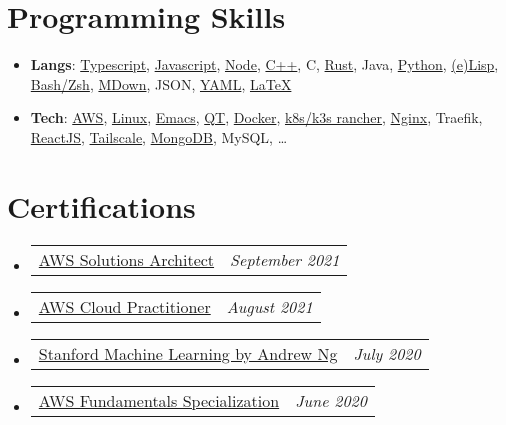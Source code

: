 \documentclass[letterpaper,11pt]{article}
\makeatletter
\newcommand{\resumeItem}[2]{
	\item[]\small{
		\textbf{#1}{: #2 \vspace{-2pt}}
	}
}
\newcommand{\certItem}[2]{
	\vspace{-1pt}\item[]
	\begin{tabular*}{0.96\textwidth}{l@{\extracolsep{\fill}}r}
		#1 & \textit{\small #2} \\
	\end{tabular*}\vspace{-7pt}
}
\newcommand{\resumeSubHeadingListStart}{\begin{itemize}[leftmargin=1mm]}
\newcommand{\resumeSubHeadingListEnd}{\end{itemize}}
\makeatother
\begin{document}
\section{Programming Skills}
\resumeSubHeadingListStart{}
\resumeItem{Langs}
{\href{https://dev.hsrn.nyu.edu/corelink/corelink-examples/-/tree/dev/example-browser}{Typescript}, \href{https://dev.hsrn.nyu.edu/corelink/corelink-examples/-/tree/dev/client-examples/javascript/simple_udp}{Javascript}, \href{https://github.com/sachiniyer/control_display/tree/main/control_display_site}{Node}, \href{https://github.com/sachiniyer/circular_buffer}{C++}, C, \href{https://github.com/sachiniyer/rustlings-solutions}{Rust}, Java, \href{https://dev.hsrn.nyu.edu/corelink/corelink-examples/-/tree/dev/client-examples/python/simple_tcp}{Python}, \href{https://github.com/sachiniyer/emacs/blob/old-config/.emacs}{(e)Lisp}, \href{https://dev.hsrn.nyu.edu/corelink/corelink-client/-/tree/dev/bash}{Bash/Zsh}, \href{https://dev.hsrn.nyu.edu/corelink/corelink-documentation/-/tree/master/docs}{MDown}, JSON, \href{https://github.com/sachiniyer/control_display/blob/main/control_display_site/deployment.yaml}{YAML}, \href{https://github.com/sachiniyer/resume/blob/master/resume.tex}{\LaTeX}} %
\resumeItem{Tech}
{\href{https://www.credly.com/badges/ef46fdf4-2c55-474d-a963-9ee14107160f}{AWS}, \href{https://github.com/sachiniyer/resume/tree/master/environment}{Linux}, \href{https://github.com/sachiniyer/emacs}{Emacs}, \href{https://github.com/sachiniyer/ip-monitor}{QT}, \href{https://github.com/sachiniyer/git-openresty/blob/main/Dockerfile}{Docker}, \href{https://github.com/sachiniyer/cheap_portable_k3s/blob/main/README.pdf}{k8s/k3s rancher}, \href{https://github.com/sachiniyer/cheap_portable_k3s/blob/main/nginx.conf}{Nginx}, Traefik, \href{https://resow.sachiniyer.com}{ReactJS}, \href{https://github.com/sachiniyer/cheap_portable_k3s/blob/main/README.pdf}{Tailscale}, \href{https://github.com/agiledev-students-fall2022/final-project-team-resow/tree/master/back-end/models}{MongoDB}, MySQL, \ldots}
\resumeSubHeadingListEnd{}


\section{Certifications}
\resumeSubHeadingListStart{}
\certItem{\href{https://www.credly.com/badges/ef46fdf4-2c55-474d-a963-9ee14107160f}{AWS Solutions Architect}}
{September 2021}
\certItem{\href{https://www.credly.com/badges/c8d7f47f-c6c1-4af9-8391-5b509b92b271}{AWS Cloud Practitioner}}
{August 2021}
\certItem{\href{https://coursera.org/share/29802cca497e8680b26b241d0ef50b59}{Stanford Machine Learning by Andrew Ng}}
{July 2020}
\certItem{\href{https://coursera.org/share/daef661212dab251985d69e4fb71f730}{AWS Fundamentals Specialization}}
{June 2020}
\resumeSubHeadingListEnd{}

\end{document}
